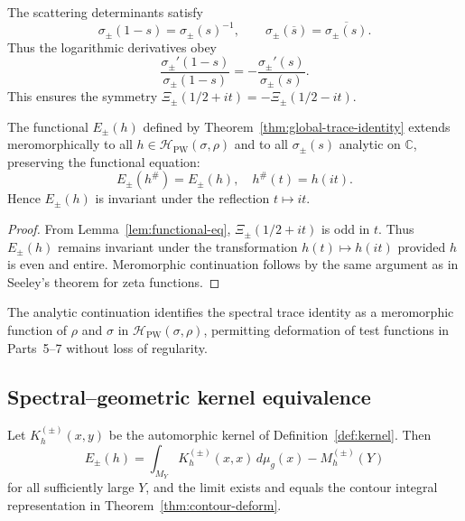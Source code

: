 \begin{lemma}
\label{lem:functional-eq}
The scattering determinants satisfy
\[
\sigma_\pm(1-s)=\sigma_\pm(s)^{-1},
\qquad
\sigma_\pm(\overline{s})=\overline{\sigma_\pm(s)}.
\]
Thus the logarithmic derivatives obey
\[
\frac{\sigma_\pm'(1-s)}{\sigma_\pm(1-s)}
=-\frac{\sigma_\pm'(s)}{\sigma_\pm(s)}.
\]
This ensures the symmetry $\Xi_\pm(1/2+it)=-\Xi_\pm(1/2-it)$. %
\end{lemma}

\begin{theorem}
\label{thm:analytic-cont-trace}
The functional $E_\pm(h)$ defined by Theorem~\ref{thm:global-trace-identity} extends meromorphically to all $h\in\mathcal{H}_{\mathrm{PW}}(\sigma,\rho)$ and to all $\sigma_\pm(s)$ analytic on $\mathbb{C}$, preserving the functional equation:
\[
E_\pm(h^\#)=E_\pm(h),
\quad h^\#(t)=h(it).
\]
Hence $E_\pm(h)$ is invariant under the reflection $t\mapsto it$. %
\end{theorem}

\begin{proof}
From Lemma~\ref{lem:functional-eq}, $\Xi_\pm(1/2+it)$ is odd in $t$.  
Thus $E_\pm(h)$ remains invariant under the transformation $h(t)\mapsto h(it)$ provided $h$ is even and entire.  
Meromorphic continuation follows by the same argument as in Seeley’s theorem for zeta functions. %
\end{proof}

\begin{remark}
\label{rem:conseq}
The analytic continuation identifies the spectral trace identity as a meromorphic function of $\rho$ and $\sigma$ in $\mathcal{H}_{\mathrm{PW}}(\sigma,\rho)$, permitting deformation of test functions in Parts~5–7 without loss of regularity. %
\end{remark}

\subsection{Spectral–geometric kernel equivalence}
\label{subsec:ch6-part4-kernel-equivalence} \relax

\begin{theorem}
\label{thm:kernel-equivalence}
Let $K_h^{(\pm)}(x,y)$ be the automorphic kernel of Definition~\ref{def:kernel}.  
Then
\[
E_\pm(h)=\int_{M_Y}K_h^{(\pm)}(x,x)\,d\mu_g(x)-M_h^{(\pm)}(Y)
\]
for all sufficiently large $Y$, and the limit exists and equals the contour integral representation in Theorem~\ref{thm:contour-deform}. %
\end{theorem}

